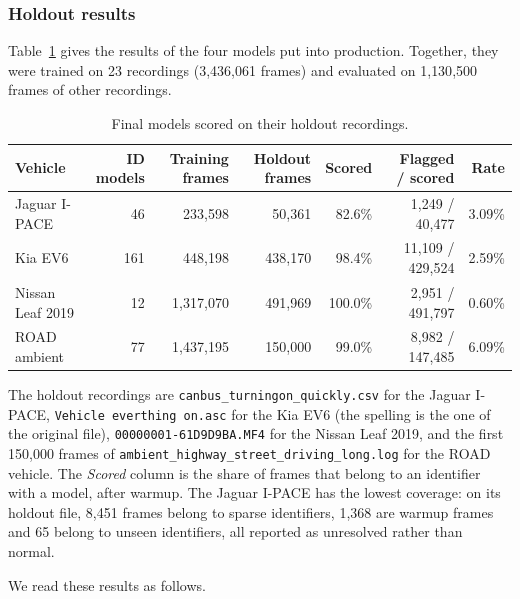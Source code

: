\subsubsection{Holdout results}

Table~\ref{tab:holdout-results} gives the results of the four models put into production. Together, they were trained on 23 recordings (3{,}436{,}061 frames) and evaluated on 1{,}130{,}500 frames of other recordings.

\begin{table}[H]
\centering
\footnotesize
\setlength{\tabcolsep}{4pt}
\caption{Final models scored on their holdout recordings.}
\label{tab:holdout-results}
\begin{tabular}{|l|r|r|r|r|r|r|}
\hline
\textbf{Vehicle} & \textbf{ID models} & \textbf{Training frames} & \textbf{Holdout frames} & \textbf{Scored} & \textbf{Flagged / scored} & \textbf{Rate} \\
\hline
Jaguar I-PACE & 46 & 233{,}598 & 50{,}361 & 82.6\% & 1{,}249 / 40{,}477 & 3.09\% \\
\hline
Kia EV6 & 161 & 448{,}198 & 438{,}170 & 98.4\% & 11{,}109 / 429{,}524 & 2.59\% \\
\hline
Nissan Leaf 2019 & 12 & 1{,}317{,}070 & 491{,}969 & 100.0\% & 2{,}951 / 491{,}797 & 0.60\% \\
\hline
ROAD ambient & 77 & 1{,}437{,}195 & 150{,}000 & 99.0\% & 8{,}982 / 147{,}485 & 6.09\% \\
\hline
\end{tabular}
\normalsize
\end{table}

The holdout recordings are \texttt{canbus\_turningon\_quickly.csv} for the Jaguar I-PACE, \texttt{Vehicle everthing on.asc} for the Kia EV6 (the spelling is the one of the original file), \texttt{00000001-61D9D9BA.MF4} for the Nissan Leaf 2019, and the first 150{,}000 frames of \texttt{ambient\_highway\_street\_driving\_long.log} for the ROAD vehicle. The \emph{Scored} column is the share of frames that belong to an identifier with a model, after warmup. The Jaguar I-PACE has the lowest coverage: on its holdout file, 8{,}451 frames belong to sparse identifiers, 1{,}368 are warmup frames and 65 belong to unseen identifiers, all reported as unresolved rather than normal.

We read these results as follows.

